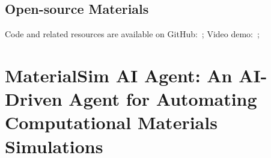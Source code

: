 \subsection*{Open-source Materials}
Code and related resources are available on GitHub: \,; Video demo: \,;






\section{MaterialSim AI Agent: An AI-Driven Agent for Automating Computational Materials Simulations}



